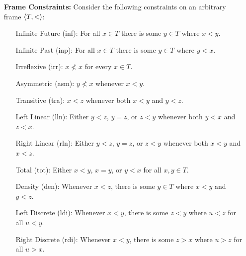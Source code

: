 \documentclass[a4paper, 11pt]{article} %
\begin{document}
\begin{enumerate}[leftmargin=1.2in]
\begin{itemize}
    \end{itemize}
  \item[\bf Frame Constraints:]
    Consider the following constraints on an arbitrary frame $\langle T, <\rangle$:
    \begin{itemize}
      \item[\sc Infinite Future (inf):] For all $x \in T$ there is some $y \in T$ where $x < y$.
      \item[\sc Infinite Past (inp):] For all $x \in T$ there is some $y \in T$ where $y < x$.
      \item[\sc Irreflexive (irr):] $x \nless x$ for every $x\in T$.
      \item[\sc Asymmetric (asm):] $y \nless x$ whenever $x < y$. 
      \item[\sc Transitive (tra):] $x < z$ whenever both $x < y$ and $y < z$. 
      \item[\sc Left Linear (lln):] Either $y < z$, $y = z$, or $z < y$ whenever both $y < x$ and $z < x$. 
      \item[\sc Right Linear (rln):] Either $y < z$, $y = z$, or $z < y$ whenever both $x < y$ and $x < z$.
      \item[\sc Total (tot):] Either $x < y$, $x = y$, or $y < x$ for all $x,y \in T$. 
      \item[\sc Density (den):] Whenever $x < z$, there is some $y \in T$ where $x < y$ and $y < z$. 
      \item[\sc Left Discrete (ldi):] Whenever $x < y$, there is some $z < y$ where $u < z$ for all $u < y$. 
      \item[\sc Right Discrete (rdi):] Whenever $x < y$, there is some $z > x$ where $u > z$ for all $u > x$. 
    \end{itemize}
\end{enumerate}
\end{document}
